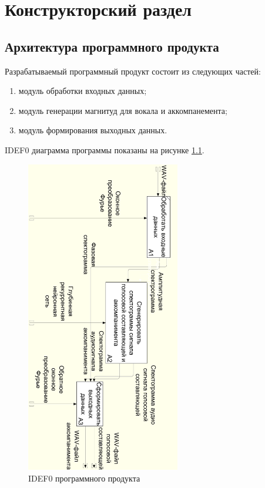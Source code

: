 \chapter{Конструкторский раздел}
\label{cha:design}

\section{Архитектура программного продукта}

Разрабатываемый программный продукт состоит из следующих частей:

\begin{enumerate}
	\item модуль обработки входных данных;
	\item модуль генерации магнитуд для вокала и аккомпанемента;
	\item модуль формирования выходных данных.
\end{enumerate}

IDEF0 диаграмма программы показаны на рисунке \ref{des:idef0}.

\begin{figure}
	\centering
	\includegraphics[width=0.6\textwidth]{inc/img/idef}
	\caption{IDEF0 программного продукта}
	\label{des:idef0}
\end{figure}

